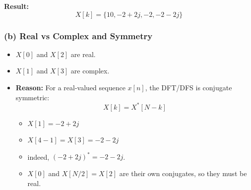 \documentclass[11pt, a4paper]{article}
\begin{document}
\textbf{Result:}
$$ X[k] = \{10, -2+2j, -2, -2-2j\} $$

\subsubsection{(b) Real vs Complex and Symmetry}
\begin{itemize}
    \item $X[0]$ and $X[2]$ are real.
    \item $X[1]$ and $X[3]$ are complex.
    \item \textbf{Reason:} For a real-valued sequence $x[n]$, the DFT/DFS is conjugate symmetric:
    $$ X[k] = X^*[N-k] $$
    \begin{itemize}
        \item $X[1] = -2+2j$
        \item $X[4-1] = X[3] = -2-2j$
        \item indeed, $(-2+2j)^* = -2-2j$.
        \item $X[0]$ and $X[N/2]=X[2]$ are their own conjugates, so they must be real.
    \end{itemize}
\end{itemize}
\end{document}
